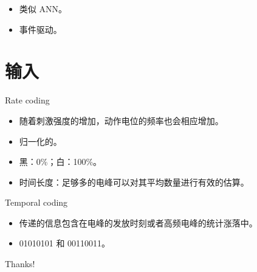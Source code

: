 \documentclass{beamer}
\begin{document}
\begin{frame}
    \begin{itemize}[<+-| alert@+>]
        \item 类似 ANN。
        \item 事件驱动。
    \end{itemize}
\end{frame}

\section{输入}

\begin{frame}{Rate coding}
    \begin{itemize}[<+-| alert@+>] %
        \item 随着刺激强度的增加，动作电位的频率也会相应增加。
        \item 归一化的。
        \item 黑：0\%；白：100\%。
        \item 时间长度：足够多的电峰可以对其平均数量进行有效的估算。
    \end{itemize}
\end{frame}

\begin{frame}{Temporal coding}
    \begin{itemize}[<+-| alert@+>]
        \item 传递的信息包含在电峰的发放时刻或者高频电峰的统计涨落中。
        \item 01010101 和 00110011。
    \end{itemize}
\end{frame}

\begin{frame}
    \begin{center}
        {\Huge\calligra Thanks!}
    \end{center}
\end{frame}
\end{document}

